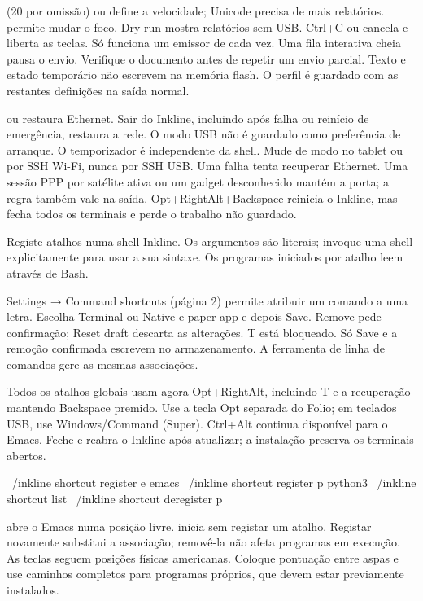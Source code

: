  (20 por omissão) ou  define a velocidade; Unicode
precisa de mais relatórios.  permite mudar o foco. Dry-run
mostra relatórios sem USB. Ctrl+C ou  cancela e liberta as teclas.
Só funciona um emissor de cada vez. Uma fila interativa cheia pausa o envio.
Verifique o documento antes de repetir um envio parcial. Texto e estado temporário
não escrevem na memória flash. O perfil é guardado com as restantes definições
na saída normal.

 ou  restaura Ethernet. Sair do Inkline,
incluindo após falha ou reinício de emergência, restaura a rede. O modo USB
não é guardado como preferência de arranque.
\UsbRecoveryExample
O temporizador é independente da shell. Mude de modo no tablet ou por SSH Wi-Fi,
nunca por SSH USB. Uma falha tenta recuperar Ethernet. Uma sessão PPP por satélite
ativa ou um gadget desconhecido mantém a porta; a regra também vale na saída.
Opt+RightAlt+Backspace reinicia o Inkline, mas fecha todos os terminais e perde
o trabalho não guardado.

Registe atalhos numa shell Inkline. Os argumentos são literais; invoque uma
shell explicitamente para usar a sua sintaxe. Os programas iniciados por atalho
leem  através de Bash.

Settings → Command shortcuts (página 2) permite atribuir um comando a uma letra. Escolha Terminal ou Native e-paper app e depois Save. Remove pede confirmação; Reset draft descarta as alterações. T está bloqueado. Só Save e a remoção confirmada escrevem no armazenamento. A ferramenta de linha de comandos gere as mesmas associações.

Todos os atalhos globais usam agora Opt+RightAlt, incluindo T e a recuperação mantendo Backspace premido. Use a tecla Opt separada do Folio; em teclados USB, use Windows/Command (Super). Ctrl+Alt continua disponível para o Emacs. Feche e reabra o Inkline após atualizar; a instalação preserva os terminais abertos.

\begin{shell}
~/inkline shortcut register e emacs
~/inkline shortcut register p python3
~/inkline shortcut list
~/inkline shortcut deregister p
\end{shell}

 abre o Emacs numa posição livre.
 inicia sem registar um atalho.
Registar novamente substitui a associação; removê-la não afeta programas em
execução. As teclas seguem posições físicas americanas. Coloque pontuação
entre aspas e use caminhos completos para programas próprios, que devem
estar previamente instalados.

